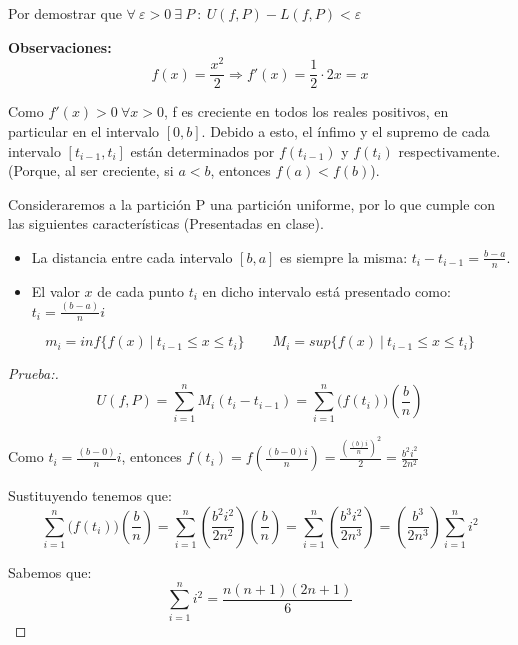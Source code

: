 \documentclass[12pt]{article}
\begin{document}
\begin{enumerate}[\hspace{9px} a)]
    Por demostrar que \(\forall \ \varepsilon>0 \ \exists \ P \ : \ U(f,P)-L(f,P)<\varepsilon\)\medskip

    \textbf{Observaciones:}
    \[f(x)=\frac{x^2}{2} \Rightarrow f'(x)=\frac{1}{2}\cdot2x = x\]

    Como \(f'(x)>0 \ \forall x>0\), f es creciente en todos los reales positivos, en particular en el intervalo $[0,b]$. Debido a esto, el \'infimo y el supremo de cada intervalo \([t_{i-1},t_i]\) est\'an determinados por \(f(t_{i-1})\) y \(f(t_i)\) respectivamente. (Porque, al ser creciente, si $a<b$, entonces \(f(a)<f(b)\)).\medskip

    Consideraremos a la partici\'on P una partici\'on uniforme, por lo que cumple con las siguientes caracter\'isticas (Presentadas en clase).
    \begin{itemize}
        \item La distancia entre cada intervalo $[b,a]$ es siempre la misma: \(t_i-t_{i-1}=\displaystyle\frac{b-a}{n}\).
        \item El valor $x$ de cada punto $t_i$ en dicho intervalo est\'a presentado como: \(t_i=\displaystyle\frac{(b-a)}{n}i\)
    \end{itemize}

    \[m_i=inf\{f(x) \ | \ t_{i-1} \leq x \leq t_i\} \qquad M_i=sup\{f(x) \ | \ t_{i-1} \leq x \leq t_i\}\]

    \begin{proof}[Prueba:]
        \begin{equation*}%
            U(f,P)=\sum_{i=1}^n M_i(t_i-t_{i-1}) = \sum_{i=1}^n \big(f(t_i)\big)\left(\displaystyle\frac{b}{n}\right)
        \end{equation*}

        Como \(t_i=\displaystyle\frac{(b-0)}{n}i\), entonces \(f(t_i)=f\left(\displaystyle\frac{(b-0)i}{n}\right) = \frac{\left(\frac{(b)i}{n}\right)^2}{2} = \frac{b^2i^2}{2n^2}\)

        Sustituyendo tenemos que:
        \begin{equation*}
            \sum_{i=1}^n \big(f(t_i)\big)\left(\displaystyle\frac{b}{n}\right) = \sum_{i=1}^n \left(\frac{b^2i^2}{2n^2}\right)\left(\displaystyle\frac{b}{n}\right) = \sum_{i=1}^n \left(\frac{b^3i^2}{2n^3}\right) = \left(\frac{b^3}{2n^3}\right) \sum_{i=1}^n i^2
        \end{equation*}

        Sabemos que: \[\sum_{i=1}^n i^2 = \frac{n(n+1)(2n+1)}{6}\]
        

\end{proof}
\end{enumerate}
\end{document}
